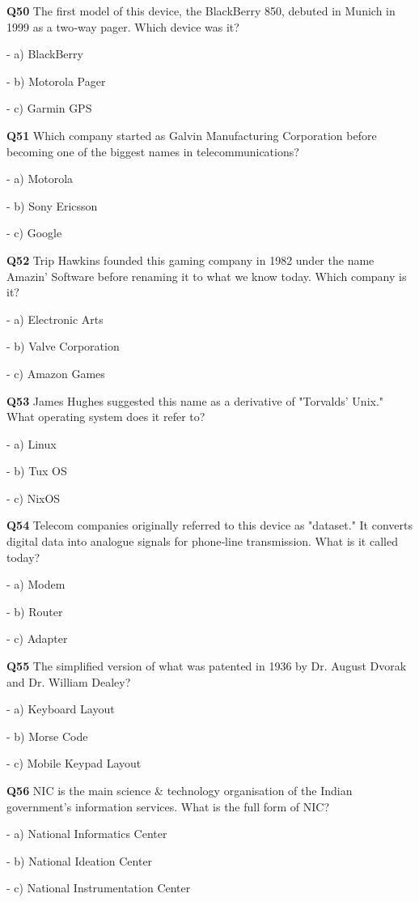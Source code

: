\textbf{Q50} The first model of this device, the BlackBerry 850, debuted in Munich in 1999 as a two‑way pager. Which device was it?\par
\quad - a) BlackBerry\par
\quad - b) Motorola Pager\par
\quad - c) Garmin GPS\par

\textbf{Q51} Which company started as Galvin Manufacturing Corporation before becoming one of the biggest names in telecommunications?\par
\quad - a) Motorola\par
\quad - b) Sony Ericsson\par
\quad - c) Google\par

\textbf{Q52} Trip Hawkins founded this gaming company in 1982 under the name Amazin' Software before renaming it to what we know today. Which company is it?\par
\quad - a) Electronic Arts\par
\quad - b) Valve Corporation\par
\quad - c) Amazon Games\par

\textbf{Q53} James Hughes suggested this name as a derivative of "Torvalds' Unix." What operating system does it refer to?\par
\quad - a) Linux\par
\quad - b) Tux OS\par
\quad - c) NixOS\par

\textbf{Q54} Telecom companies originally referred to this device as "dataset." It converts digital data into analogue signals for phone‑line transmission. What is it called today?\par
\quad - a) Modem\par
\quad - b) Router\par
\quad - c) Adapter\par

\textbf{Q55} The simplified version of what was patented in 1936 by Dr. August Dvorak and Dr. William Dealey?\par
\quad - a) Keyboard Layout\par
\quad - b) Morse Code\par
\quad - c) Mobile Keypad Layout\par

\textbf{Q56} NIC is the main science & technology organisation of the Indian government's information services. What is the full form of NIC?\par
\quad - a) National Informatics Center\par
\quad - b) National Ideation Center\par
\quad - c) National Instrumentation Center\par

